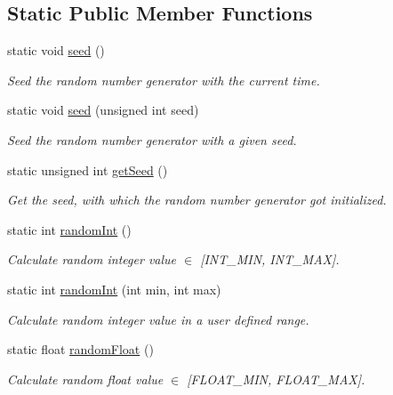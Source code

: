 \subsection*{Static Public Member Functions}
\begin{DoxyCompactItemize}
\item 
static void \mbox{\hyperlink{classr3_1_1_random_afa6a47432ea2058f6424618bf77494f2}{seed}} ()
\begin{DoxyCompactList}\small\item\em Seed the random number generator with the current time. \end{DoxyCompactList}\item 
static void \mbox{\hyperlink{classr3_1_1_random_a5fbe1e0d20952af9374f024a24735d80}{seed}} (unsigned int seed)
\begin{DoxyCompactList}\small\item\em Seed the random number generator with a given seed. \end{DoxyCompactList}\item 
static unsigned int \mbox{\hyperlink{classr3_1_1_random_a5d1f4fef27e14bde1e3b560728b7d3ba}{get\+Seed}} ()
\begin{DoxyCompactList}\small\item\em Get the seed, with which the random number generator got initialized. \end{DoxyCompactList}\item 
static int \mbox{\hyperlink{classr3_1_1_random_a72b76209864f485f539b6edccc434d9e}{random\+Int}} ()
\begin{DoxyCompactList}\small\item\em Calculate random integer value $\in$ \mbox{[}I\+N\+T\+\_\+\+M\+IN, I\+N\+T\+\_\+\+M\+AX\mbox{]}. \end{DoxyCompactList}\item 
static int \mbox{\hyperlink{classr3_1_1_random_af98cf3295385b16f0369addeed024ce0}{random\+Int}} (int min, int max)
\begin{DoxyCompactList}\small\item\em Calculate random integer value in a user defined range. \end{DoxyCompactList}\item 
static float \mbox{\hyperlink{classr3_1_1_random_a3b1100f056013575372f2b1a362da39f}{random\+Float}} ()
\begin{DoxyCompactList}\small\item\em Calculate random float value $\in$ \mbox{[}F\+L\+O\+A\+T\+\_\+\+M\+IN, F\+L\+O\+A\+T\+\_\+\+M\+AX\mbox{]}. \end{DoxyCompactList}\item 

\end{DoxyCompactItemize}
